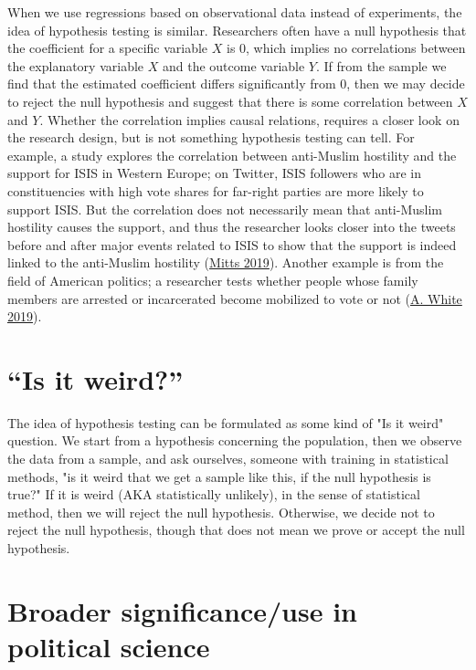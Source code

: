 \documentclass{book}
\begin{document}
When we use regressions based on observational data instead of experiments,
the idea of hypothesis testing is similar. Researchers often have a null
hypothesis that the coefficient for a specific variable \(X\) is 0, which
implies no correlations between the explanatory variable \(X\) and the outcome
variable \(Y\). If from the sample we find that the estimated coefficient
differs significantly from 0, then we may decide to reject the null hypothesis
and suggest that there is some correlation between \(X\) and \(Y\). Whether
the correlation implies causal relations, requires a closer look on the
research design, but is not something hypothesis testing can tell. For
example, a study explores the correlation between anti-Muslim hostility and
the support for ISIS in Western Europe; on Twitter, ISIS followers who are in
constituencies with high vote shares for far-right parties are more likely to
support ISIS. But the correlation does not necessarily mean that anti-Muslim
hostility causes the support, and thus the researcher looks closer into the
tweets before and after major events related to ISIS to show that the support
is indeed linked to the anti-Muslim hostility
(\protect\hyperlink{ref-mitts_2019}{Mitts 2019}). Another example is from the
field of American politics; a researcher tests whether people whose family
members are arrested or incarcerated become mobilized to vote or not
(\protect\hyperlink{ref-white_2019}{A. White 2019}).

\hypertarget{is-it-weird}{%
\section{``Is it weird?''}\label{is-it-weird}}

The idea of hypothesis testing can be formulated as some kind of "Is it weird"
question. We start from a hypothesis concerning the population, then we
observe the data from a sample, and ask ourselves, someone with training in
statistical methods, "is it weird that we get a sample like this, if the null
hypothesis is true?" If it is weird (AKA statistically unlikely), in the sense
of statistical method, then we will reject the null hypothesis. Otherwise, we
decide not to reject the null hypothesis, though that does not mean we prove
or accept the null hypothesis.

\hypertarget{broader-significanceuse-in-political-science-1}{%
\section{Broader significance/use in political
science}\label{broader-significanceuse-in-political-science-1}}
\end{document}
